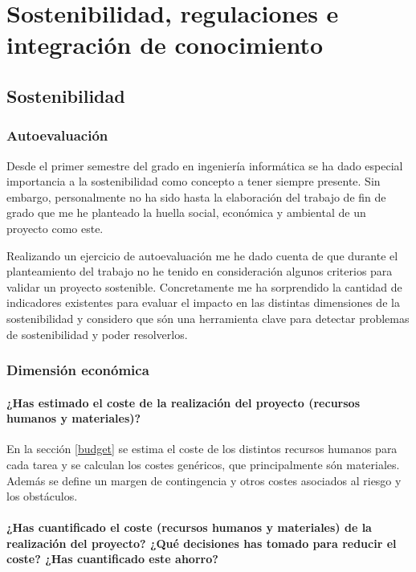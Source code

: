 \chapter{Sostenibilidad, regulaciones e integración de conocimiento}
\section{Sostenibilidad}
\subsection{Autoevaluación}
Desde el primer semestre del grado en ingeniería informática se ha dado especial importancia a
la sostenibilidad como concepto a tener siempre presente. Sin embargo, personalmente no ha sido hasta
la elaboración del trabajo de fin de grado que me he planteado la huella social, económica y 
ambiental de un proyecto como este.

Realizando un ejercicio de autoevaluación me he dado cuenta de que durante el planteamiento del
trabajo no he tenido en consideración algunos criterios para validar un
proyecto sostenible. Concretamente me ha sorprendido la cantidad de indicadores existentes
para evaluar el impacto en las distintas dimensiones de la sostenibilidad y considero que
són una herramienta clave para detectar problemas de sostenibilidad y poder resolverlos.

\subsection{Dimensión económica}
\subsubsection{¿Has estimado el coste de la realización del proyecto (recursos humanos y materiales)?}

En la sección \ref{budget} se estima el coste de los distintos recursos humanos para cada
tarea y se calculan los costes genéricos, que principalmente són materiales.
Además se define un margen de contingencia y otros costes asociados al riesgo y los obstáculos.

\subsubsection{¿Has cuantificado el coste (recursos humanos y materiales) de la realización del proyecto? ¿Qué decisiones has tomado para reducir el coste? ¿Has cuantificado este ahorro?}

